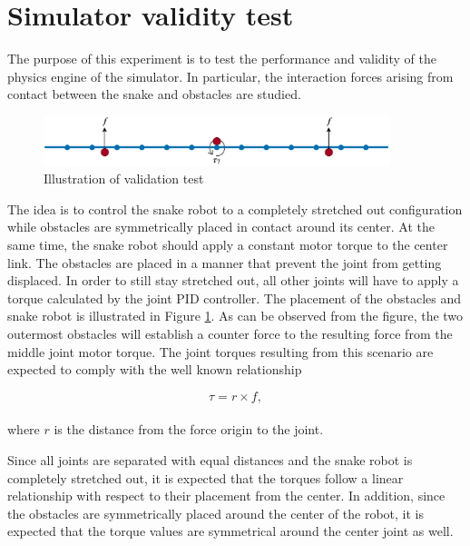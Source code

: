 \section{Simulator validity test}

The purpose of this experiment is to test the performance and validity of the physics engine of the simulator. In particular, the interaction forces arising from contact between the snake and obstacles are studied.

\begin{figure}
    \centering
    \includegraphics[width=0.9\textwidth]{figures/experiments/exp_valid1.pdf}
    \caption{Illustration of validation test}
    \label{fig:valid1_sketch}
\end{figure}

The idea is to control the snake robot to a completely stretched out configuration while obstacles are symmetrically placed in contact around its center. At the same time, the snake robot should apply a constant motor torque to the center link. The obstacles are placed in a manner that prevent the joint from getting displaced. In order to still stay stretched out, all other joints will have to apply a torque calculated by the joint PID controller. The placement of the obstacles and snake robot is illustrated in Figure \ref{fig:valid1_sketch}. As can be observed from the figure, the two outermost obstacles will establish a counter force to the resulting force from the middle joint motor torque. The joint torques resulting from this scenario are expected to comply with the well known relationship

\begin{equation}
    \tau = r\times f,
\end{equation}
\\
where $r$ is the distance from the force origin to the joint.

Since all joints are separated with equal distances and the snake robot is completely stretched out, it is expected that the torques follow a linear relationship with respect to their placement from the center. In addition, since the obstacles are symmetrically placed around the center of the robot, it is expected that the torque values are symmetrical around the center joint as well.

